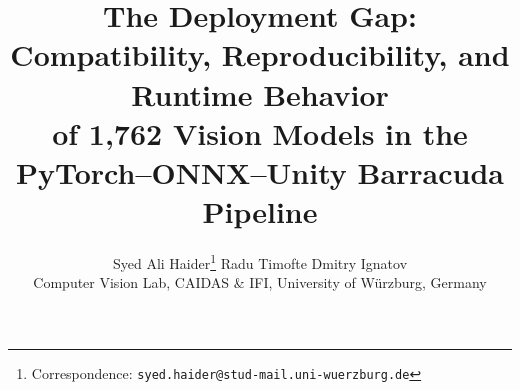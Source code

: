 \documentclass[10pt,twocolumn]{article}
\begin{document}
\title{The Deployment Gap: Compatibility, Reproducibility, and Runtime Behavior\\of 1,762 Vision Models in the PyTorch--ONNX--Unity Barracuda Pipeline}
\author{Syed Ali Haider\thanks{Correspondence: \texttt{\scriptsize syed.haider@stud-mail.uni-wuerzburg.de}} \quad Radu Timofte \quad Dmitry Ignatov\\
\small Computer Vision Lab, CAIDAS \& IFI, University of W\"urzburg, Germany}
\date{}
\maketitle

\PipelineFigure

\end{document}
